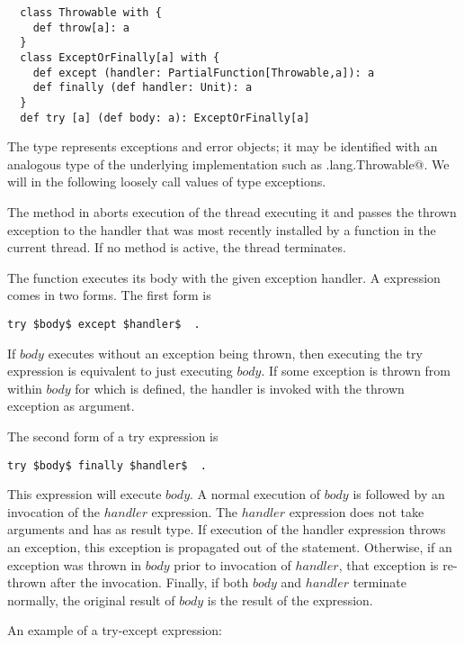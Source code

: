 \documentclass[11pt]{report}
\begin{document}
\begin{itemize}
\begin{verbatim}
  class Throwable with {
    def throw[a]: a
  }
  class ExceptOrFinally[a] with {
    def except (handler: PartialFunction[Throwable,a]): a
    def finally (def handler: Unit): a
  }
  def try [a] (def body: a): ExceptOrFinally[a]
\end{verbatim}

The type \verb@Throwable@ represents exceptions and error objects; it
may be identified with an analogous type of the underlying
implementation such as \verb@java.lang.Throwable@. We will in the
following loosely call values of type \verb@Throwable@ exceptions.

The \verb@throw@ method in \verb@Throwable@ aborts execution of the
thread executing it and passes the thrown exception to the handler
that was most recently installed by a
\verb@try@ function in the current thread. If no \verb@try@ method is
active, the thread terminates.

The \verb@try@ function executes its body with the given exception
handler. A \verb@try@ expression comes in two forms. The first form is

\begin{verbatim}
try $body$ except $handler$  .
\end{verbatim}

If $body$ executes without an exception being thrown, then executing
the try expression is equivalent to just executing $body$. If some
exception is thrown from within $body$ for which \verb@handler@ is defined,
the handler is invoked with the thrown exception as argument.

The second form of a try expression is

\begin{verbatim}
try $body$ finally $handler$  .
\end{verbatim}

This expression will execute $body$. A normal execution of $body$ is
followed by an invocation of the $handler$ expression.  The $handler$
expression does not take arguments and has \verb@Unit@ as result type.
If execution of the handler expression throws an exception, this
exception is propagated out of the \verb@try@ statement.  Otherwise,
if an exception was thrown in $body$ prior to invocation of $handler$,
that exception is re-thrown after the invocation. Finally, if both
$body$ and $handler$ terminate normally, the original result of
$body$ is the result of the \verb@try@ expression.

\example An example of a try-except expression:


\end{itemize}
\end{document}

